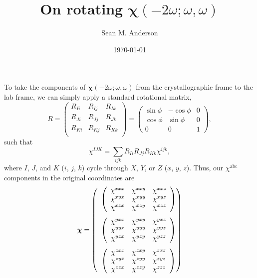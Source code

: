 \documentclass[aps,prb,10pt,letterpaper,notitlepage]{revtex4-1}
\begin{document}
\title{On rotating $\boldsymbol{\chi}(-2\omega;\omega,\omega)$}
\author{Sean M. Anderson}
\date{\today}

\maketitle

To take the components of $\boldsymbol{\chi}(-2\omega;\omega,\omega)$ from the
crystallographic frame to the lab frame, we can simply apply a standard
rotational matrix,
\begin{equation}
R =
\begin{pmatrix}
R_{Ii} & R_{Ij} & R_{Ik} \\
R_{Ji} & R_{Jj} & R_{Jk} \\
R_{Ki} & R_{Kj} & R_{Kk} \\
\end{pmatrix}
=
\begin{pmatrix}
\sin\phi & -\cos\phi & 0 \\
\cos\phi &  \sin\phi & 0 \\
    0    &      0    & 1
\end{pmatrix},
\end{equation}
such that
\begin{equation}
\chi^{IJK} = \sum_{ijk}R_{Ii}R_{Jj}R_{Kk}\chi^{ijk},
\end{equation}
where $I$, $J$, and $K$ ($i$, $j$, $k$) cycle through $X$, $Y$, or $Z$ ($x$,
$y$, $z$). Thus, our $\chi^{\mathrm{abc}}$ components in the original
coordinates are
\begin{equation}
\boldsymbol{\chi} = 
\left( 
\begin{array}{c@{}}
\left(\begin{array}{c c c}
\chi^{xxx} & \chi^{xxy} & \chi^{xxz} \\
\chi^{xyx} & \chi^{xyy} & \chi^{xyz} \\
\chi^{xzx} & \chi^{xzy} & \chi^{xzz} 
\end{array}\right)\\[20pt]
\left(\begin{array}{c c c}
\chi^{yxx} & \chi^{yxy} & \chi^{yxz} \\
\chi^{yyx} & \chi^{yyy} & \chi^{yyz} \\
\chi^{yzx} & \chi^{yzy} & \chi^{yzz} 
\end{array}\right)\\[20pt]
\left(\begin{array}{c c c}
\chi^{zxx} & \chi^{zxy} & \chi^{zxz} \\
\chi^{zyx} & \chi^{zyy} & \chi^{zyz} \\
\chi^{zzx} & \chi^{zzy} & \chi^{zzz} 
\end{array}\right)
\end{array}\right)
\end{equation}
\end{document}
